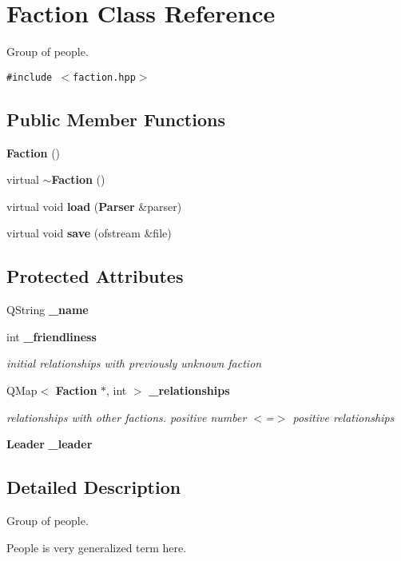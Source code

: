 \section{Faction Class Reference}
\label{classFaction}
Group of people.  


{\tt \#include $<$faction.hpp$>$}

\subsection*{Public Member Functions}
\begin{CompactItemize}
\item 
{\bf Faction} ()
\item 
virtual {\bf $\sim$Faction} ()
\item 
virtual void {\bf load} ({\bf Parser} \&parser)
\item 
virtual void {\bf save} (ofstream \&file)
\end{CompactItemize}
\subsection*{Protected Attributes}
\begin{CompactItemize}
\item 
QString {\bf \_\-name}
\item 
int {\bf \_\-friendliness}
\begin{CompactList}\small\item\em initial relationships with previously unknown faction \item\end{CompactList}\item 
QMap$<$ {\bf Faction} $\ast$, int $>$ {\bf \_\-relationships}
\begin{CompactList}\small\item\em relationships with other factions. positive number $<$=$>$ positive relationships \item\end{CompactList}\item 
{\bf Leader} {\bf \_\-leader}
\end{CompactItemize}


\subsection{Detailed Description}
Group of people. 

People is very generalized term here.

